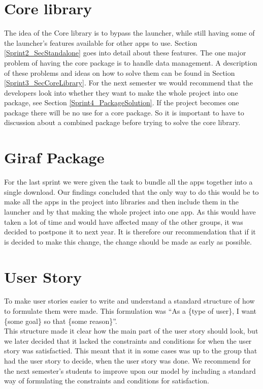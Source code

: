 \section{Core library}
\label{nextyear_core}
The idea of the Core library is to bypass the launcher, while still having some of the launcher’s features available for other apps to use. Section \ref{Sprint2_SecStandalone} goes into detail about these features. The one major problem of having the core package is to handle data management. A description of these problems and ideas on how to solve them can be found in Section \ref{Sprint3_SecCoreLibrary}.
For the next semester we would recommend that the developers look into whether they want to make the whole project into one package, see Section \ref{Sprint4_PackageSolution}. If the project becomes one package there will be no use for a core package. So it is important to have to discussion about a combined package before trying to solve the core library.

\section{Giraf Package}
\label{nextyear_package}
For the last sprint we were given the task to bundle all the apps together into a single download. Our findings concluded that the only way to do this would be to make all the apps in the project into libraries and then include them in the launcher and by that making the whole project into one app. As this would have taken a lot of time and would have affected many of the other groups, it was decided to postpone it to next year. It is therefore our recommendation that if it is decided to make this change, the change should be made as early as possible.

\section{User Story}
To make user stories easier to write and understand a standard structure of how to formulate them were made. This formulation was “As a \{type of user\}, I want \{some goal\} so that \{some reason\}”.\\
This structure made it clear how the main part of the user story should look, but we later decided that it lacked the constraints and conditions for when the user story was satisfactied. This meant that it in some cases was up to the group that had the user story to decide, when the user story was done. We recommend for the next semester’s  students to improve upon our model by including a standard way of formulating the constraints and conditions for satisfaction.


